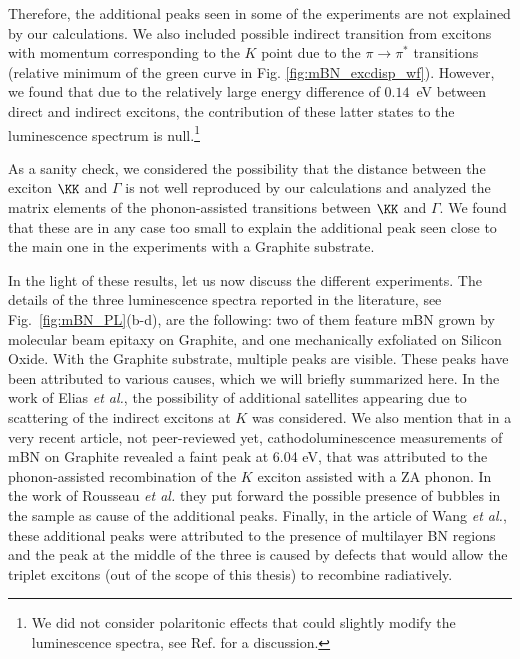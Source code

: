 Therefore, the additional peaks seen in some of the experiments are not explained by our calculations. We also included possible indirect transition from excitons with momentum corresponding to the $K$ point due to the $\pi \rightarrow \pi^*$ transitions (relative minimum of the green curve in Fig. \ref{fig:mBN_excdisp_wf}). However, we found that due to the relatively large energy difference of $0.14$~eV between direct and indirect excitons, the contribution of these latter states to the luminescence spectrum is null.\footnote{We did not consider polaritonic effects that could slightly modify the luminescence spectra, see Ref. \cite{henriques2019optical} for a discussion.}

As a sanity check, we considered the possibility that the distance between the exciton $\KK$ and $\Gamma$ is not well reproduced by our calculations and analyzed the matrix elements of the phonon-assisted transitions between $\KK$ and $\Gamma$. We found that these are in any case too small to explain the additional peak seen close to the main one in the experiments with a Graphite substrate.

In the light of these results, let us now discuss the different experiments. The details of the three luminescence spectra reported in the literature, see Fig.~\ref{fig:mBN_PL}(b-d), are the following: two of them feature mBN grown by molecular beam epitaxy on Graphite,\cite{elias2019direct,wang2022scalable} and one mechanically exfoliated on Silicon Oxide.\cite{rousseau2021monolayer}
With the Graphite substrate, multiple peaks are visible.
These peaks have been attributed to various causes, which we will briefly summarized here. In the work of Elias \emph{et al.},\cite{elias2019direct} the possibility of additional satellites appearing due to scattering of the indirect excitons at $K$ was considered. We also mention that in a very recent article, not peer-reviewed yet,\cite{shima2023cathodoluminescence} cathodoluminescence measurements of mBN on Graphite revealed a faint peak at 6.04 eV, that was attributed to the phonon-assisted recombination of the $K$ exciton assisted with a ZA phonon.
In the work of Rousseau \emph{et al.}\cite{rousseau2021monolayer} they put forward the possible presence of bubbles in the sample as cause of the additional peaks. 
Finally, in the article of Wang \emph{et al.}\cite{wang2022scalable}, these additional peaks were attributed to the presence of multilayer BN regions and the peak at the middle of the three is caused by defects that would allow the triplet excitons (out of the scope of this thesis) to recombine radiatively. 


